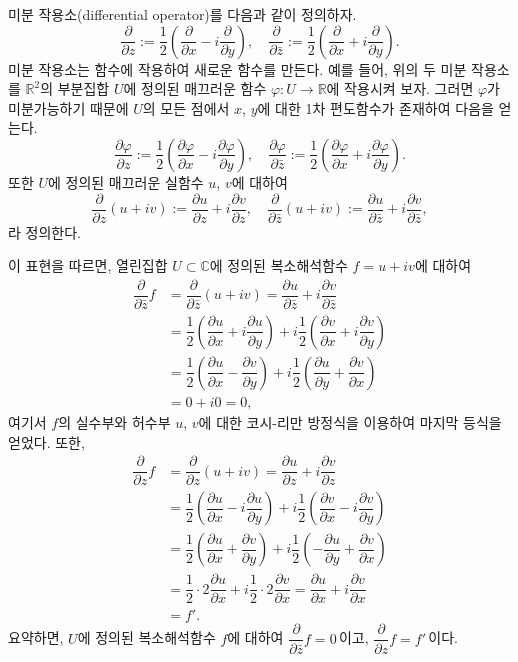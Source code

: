 미분 작용소(differential operator)를 다음과 같이 정의하자.
\[
\dfrac\partial {\partial z} := 
\dfrac 12 \left( \dfrac\partial {\partial x} - i \dfrac\partial {\partial y} \right),
\quad
\dfrac\partial {\partial \bar z} :=
\dfrac 12 \left( \dfrac\partial {\partial x} + i \dfrac\partial {\partial y} \right).
\]
미분 작용소는 함수에 작용하여 새로운 함수를 만든다.
예를 들어, 위의 두 미분 작용소를 
$\mathbb R^2$의 부분집합 $U$에 정의된 매끄러운 함수 $\varphi: U\to \mathbb R$에
작용시켜 보자.
그러면 $\varphi$가 미분가능하기 때문에
$U$의 모든 점에서 $x$, $y$에 대한 1차 편도함수가 존재하여 다음을 얻는다.
\[
\dfrac{\partial \varphi}{\partial z} := 
\dfrac 12 \left( \dfrac{\partial \varphi}{\partial x} 
- i \dfrac{\partial \varphi}{\partial y} \right),
\quad
\dfrac{\partial \varphi}{\partial \bar z} :=
\dfrac 12 \left( \dfrac{\partial \varphi}{\partial x} 
+ i \dfrac{\partial \varphi}{\partial y} \right).
\]
또한 $U$에 정의된 매끄러운 실함수 $u$, $v$에 대하여
\[
\dfrac\partial {\partial z}(u+iv)
:= \dfrac{\partial u}{\partial z} + i\dfrac{\partial v}{\partial z},
\quad
\dfrac\partial {\partial \bar z}(u+iv)
:= \dfrac{\partial u}{\partial \bar z} + i\dfrac{\partial v}{\partial \bar z},
\]
라 정의한다.

이 표현을 따르면, 
열린집합 $U\subset \mathbb C$에 정의된 복소해석함수 $f=u+iv$에 대하여
\begin{align*}
\dfrac{\partial}{\partial \bar z} f
&= \dfrac{\partial}{\partial \bar z} (u+iv) 
= \dfrac{\partial u}{\partial \bar z} + i\dfrac{\partial v}{\partial \bar z} \\
&= \dfrac 12 \left( \dfrac{\partial u}{\partial x} 
+ i \dfrac{\partial u}{\partial y} \right)
+ i\dfrac 12 \left( \dfrac{\partial v}{\partial x} 
+ i \dfrac{\partial v}{\partial y} \right) \\
&= \dfrac 12 \left( \dfrac{\partial u}{\partial x} 
- \dfrac{\partial v}{\partial y} \right)
+ i\dfrac 12 \left( \dfrac{\partial u}{\partial y} 
+ \dfrac{\partial v}{\partial x} \right) \\
&= 0 + i0 = 0,
\end{align*}
여기서 $f$의 실수부와 허수부 $u$, $v$에 대한 코시-리만 방정식을 이용하여
마지막 등식을 얻었다.
또한, 
\begin{align*}
\dfrac{\partial}{\partial z} f
&= \dfrac{\partial}{\partial z} (u+iv) 
= \dfrac{\partial u}{\partial  z} + i\dfrac{\partial v}{\partial z} \\
&= \dfrac 12 \left( \dfrac{\partial u}{\partial x} 
- i \dfrac{\partial u}{\partial y} \right)
+ i\dfrac 12 \left( \dfrac{\partial v}{\partial x} 
- i \dfrac{\partial v}{\partial y} \right) \\
&= \dfrac 12 \left( \dfrac{\partial u}{\partial x} 
+ \dfrac{\partial v}{\partial y} \right)
+ i\dfrac 12 \left( - \dfrac{\partial u}{\partial y} 
+ \dfrac{\partial v}{\partial x} \right) \\
&= \dfrac12 \cdot 2 \dfrac{\partial u}{\partial x} 
+ i\dfrac12 \cdot 2 \dfrac{\partial v}{\partial x} 
= \dfrac{\partial u}{\partial x}  + i \dfrac{\partial v}{\partial x}  \\
&= f'.
\end{align*}
요약하면, $U$에 정의된 복소해석함수 $f$에 대하여
$\dfrac{\partial}{\partial \bar z} f =0$\,이고,
$\dfrac{\partial}{\partial z} f =f'$\,이다.

